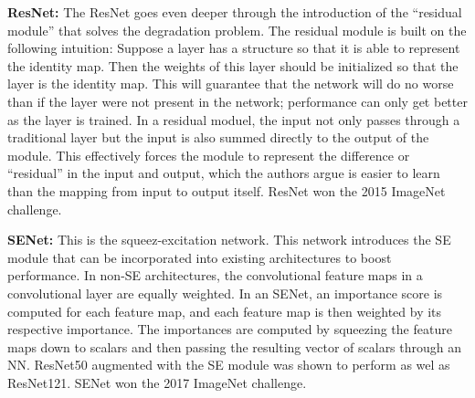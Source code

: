 \documentclass[11pt]{article}
\begin{document}
\textbf{ResNet:} The ResNet goes even deeper through the introduction of the ``residual module'' that solves the degradation problem. The residual module is built on the following intuition: Suppose a layer has a structure so that it is able to represent the identity map. Then the weights of this layer should be initialized so that the layer is the identity map. This will guarantee that the network will do no worse than if the layer were not present in the network; performance can only get better as the layer is trained. In a residual moduel, the input not only passes through a traditional layer but the input is also summed directly to the output of the module. This effectively forces the module to represent the difference or ``residual'' in the input and output, which the authors argue is easier to learn than the mapping from input to output itself. ResNet won the 2015 ImageNet challenge.

\textbf{SENet:} This is the squeez-excitation network. This network introduces the SE module that can be incorporated into existing architectures to boost performance. In non-SE architectures, the convolutional feature maps in a convolutional layer are equally weighted. In an SENet, an importance score is computed for each feature map, and each feature map is then weighted by its respective importance. The importances are computed by squeezing the feature maps down to scalars and then passing the resulting vector of scalars through an NN. ResNet50 augmented with the SE module was shown to perform as wel as ResNet121. SENet won the 2017 ImageNet challenge.
\end{document}
